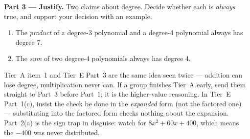 \documentclass[10pt]{article}
\begin{document}
\begin{tcolorbox}[colback=white, colframe=black!40, title=\textbf{Tier E --- Extension},
    fonttitle=\bfseries, arc=1.5mm, left=3mm, right=3mm, top=2mm, bottom=2mm, breakable]
\vspace{5pt}
\textbf{Part 3 --- Justify.} Two claims about degree. Decide whether each is \emph{always} true, and
support your decision with an example.
\begin{enumerate}[label=(\alph*), leftmargin=1.8em, itemsep=6pt]
  \item The \emph{product} of a degree-3 polynomial and a degree-4 polynomial always has degree 7.
  \item The \emph{sum} of two degree-4 polynomials always has degree 4.
\end{enumerate}
\end{tcolorbox}

\begin{teachernote}
Tier~A item~1 and Tier~E Part~3 are the same idea seen twice --- addition can lose degree, multiplication
never can. If a group finishes Tier~A early, send them straight to Part~3 before Part~1; it is the
higher-value reasoning. In Tier~E Part~1(c), insist the check be done in the \emph{expanded} form
(not the factored one) --- substituting into the factored form checks nothing about the expansion.
Part~2(a) is the sign trap in disguise: watch for $8x^2+60x+400$, which means the $-400$ was never
distributed.
\end{teachernote}
\end{document}
